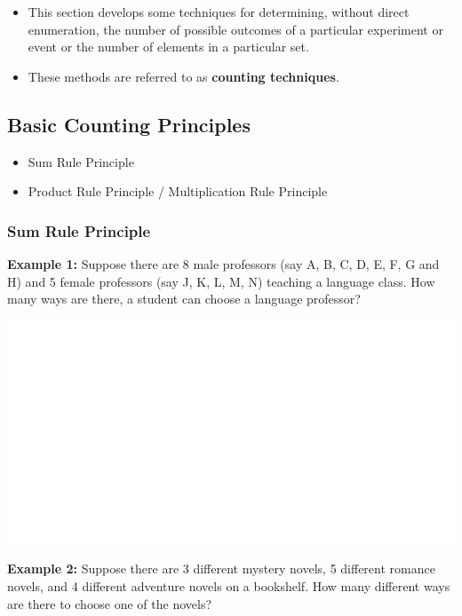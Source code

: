 \documentclass[]{book}
\providecommand{\tightlist}{%
  \setlength{\itemsep}{0pt}\setlength{\parskip}{0pt}}
\begin{document}
\begin{itemize}
\tightlist
\item
  This section develops some techniques for determining, without direct enumeration, the number of possible outcomes of a particular experiment or event or the number of elements in a particular set.
\item
  These methods are referred to as \textbf{counting techniques}.
\end{itemize}

\hypertarget{basic-counting-principles}{%
\subsection{Basic Counting Principles}\label{basic-counting-principles}}

\begin{itemize}
\tightlist
\item
  Sum Rule Principle
\item
  Product Rule Principle / Multiplication Rule Principle
\end{itemize}

\hypertarget{sum-rule-principle}{%
\subsubsection{Sum Rule Principle}\label{sum-rule-principle}}

\textbf{Example 1:} Suppose there are 8 male professors (say A, B, C, D, E, F, G and H) and 5 female professors (say J, K, L, M, N) teaching a language class. How many ways are there, a student can choose a language professor?

\begin{center}\includegraphics[width=1\linewidth]{figure/box81-1} \end{center}

\textbf{Example 2:} Suppose there are 3 different mystery novels, 5 different romance novels, and 4 different adventure novels on a bookshelf. How many different ways are there to choose one of the novels?
\end{document}
